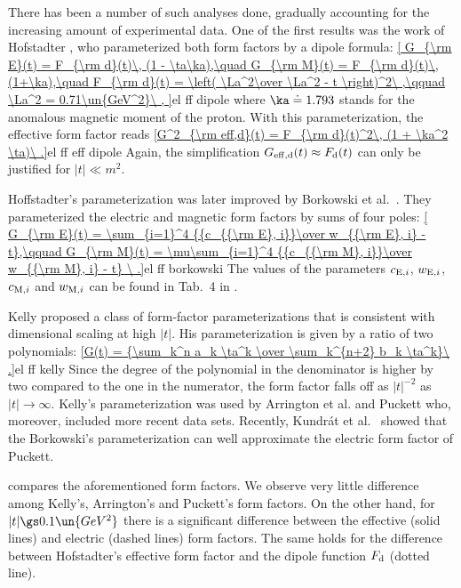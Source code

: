 There has been a number of such analyses done, gradually accounting for the increasing amount of experimental data. One of the first results was the work of Hofstadter , who parameterized both form factors by a dipole formula:
\eqref{
	G_{\rm E}(t) = F_{\rm d}(t)\, (1 - \ta\ka),\quad
	G_{\rm M}(t) = F_{\rm d}(t)\, (1+\ka),\quad
	F_{\rm d}(t) = \left( \La^2\over \La^2 - t \right)^2\ ,\qquad
	\La^2 = 0.71\un{GeV^2}\ ,
}{el ff dipole}
where $\ka\doteq 1.793$ stands for the anomalous magnetic moment of the proton. With this parameterization, the effective form factor reads
\eqref{G^2_{\rm eff,d}(t) = F_{\rm d}(t)^2\, (1 + \ka^2 \ta)\ .}{el ff eff dipole}
Again, the simplification $G_{\rm eff,d}(t)\approx F_{\rm d}(t)$ can only be justified for $|t| \ll m^2$.

Hoffstadter's parameterization was later improved by Borkowski et al.~. They parameterized the electric and magnetic form factors by sums of four poles:
\eqref{
G_{\rm E}(t) = \sum_{i=1}^4 {{c_{{\rm E}, i}}\over w_{{\rm E}, i} - t},\qquad
G_{\rm M}(t) = \mu\sum_{i=1}^4 {{c_{{\rm M}, i}}\over w_{{\rm M}, i} - t}
\ .}{el ff borkowski}
The values of the parameters $c_{{\rm E}, i}$, $w_{{\rm E}, i}$, $c_{{\rm M}, i}$ and $w_{{\rm M}, i}$ can be found in Tab.~4 in .

Kelly  proposed a class of form-factor parameterizations that is consistent with dimensional scaling at high $|t|$. His parameterization is given by a ratio of two polynomials:
\eqref{G(t) = {\sum_k^n a_k \ta^k \over \sum_k^{n+2} b_k \ta^k}\ .}{el ff kelly}
Since the degree of the polynomial in the denominator is higher by two compared to the one in the numerator, the form factor falls off as $|t|^{-2}$ as $|t|\to\infty$. Kelly's parameterization was used by Arrington et al.  and Puckett  who, moreover, included more recent data sets. Recently, Kundr\' at et al.~ showed that the Borkowski's parameterization can well approximate the electric form factor of Puckett.

 compares the aforementioned form factors. We observe very little difference among Kelly's, Arrington's and Puckett's form factors. On the other hand, for $|t| \gs 0.1\un{GeV^2}$ there is a significant difference between the effective (solid lines) and electric (dashed lines) form factors. The same holds for the difference between Hofstadter's effective form factor and the dipole function $F_{\rm d}$ (dotted line).

